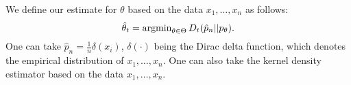 \documentclass{article}
\def\argmin{\mathop{\rm argmin}\nolimits}
\begin{document}
We define our estimate for $\theta$ based on the data $x_1,\dots,x_n$ as follows: 
\begin{equation}
\label{estimate}
\hat{\theta}_t=\argmin_{\theta \in \Theta}D_t(\hat{p}_n||p_\theta).
\end{equation}
One can take $\hat{p}_n=\frac{1}{n}\delta(x_i)$, $\delta(\cdot)$ being the Dirac delta function, which denotes the empirical distribution of $x_1,\dots,x_n$. One can also take the kernel density estimator %
based on the data $x_1,\dots,x_n$. 
\end{document}
